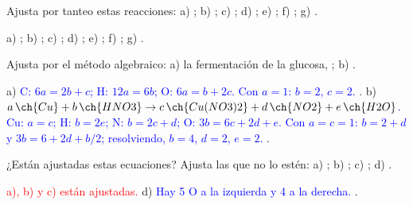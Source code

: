 \begin{exercise}
    Ajusta por tanteo estas reacciones: a) ; b) ;
    c) ; d) ; e) ;
    f) ; g) .
    \begin{solu}
        a) \textcolor{red}{}; b) \textcolor{red}{};
        c) \textcolor{red}{}; d) \textcolor{red}{};
        e) \textcolor{red}{}; f) \textcolor{red}{};
        g) \textcolor{red}{}.
    \end{solu}
\end{exercise}

\begin{exercise}
    Ajusta por el método algebraico: a) la fermentación de la glucosa, ; b) .
    \begin{solu}
        a) \textcolor{blue}{C: \(6a = 2b + c\); H: \(12a = 6b\); O: \(6a = b + 2c\). Con \(a = 1\): \(b = 2\), \(c = 2\).}
        \textcolor{red}{}.
        b) \textcolor{blue}{\(a\,\ch{Cu} + b\,\ch{HNO3} \rightarrow c\,\ch{Cu(NO3)2} + d\,\ch{NO2} + e\,\ch{H2O}\). Cu: \(a = c\); H: \(b = 2e\); N: \(b = 2c + d\);
        O: \(3b = 6c + 2d + e\). Con \(a = c = 1\): \(b = 2 + d\) y \(3b = 6 + 2d + b/2\); resolviendo, \(b = 4\), \(d = 2\), \(e = 2\).}
        \textcolor{red}{}.
    \end{solu}
\end{exercise}

\begin{exercise}
    ¿Están ajustadas estas ecuaciones? Ajusta las que no lo estén: a) ;
    b) ; c) ; d) .
    \begin{solu}
        \textcolor{red}{a), b) y c) están ajustadas.} d) \textcolor{blue}{Hay 5 O a la izquierda y 4 a la derecha.}
        \textcolor{red}{}.
    \end{solu}
\end{exercise}

